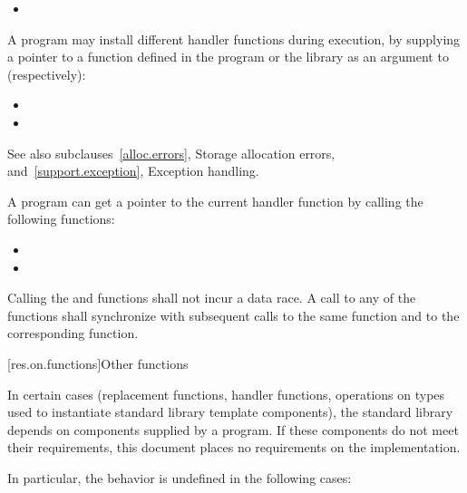 \begin{itemize}
\item
{}
%
\end{itemize}

\pnum
A \Cpp{} program may install different handler functions during execution, by
supplying a pointer to a function defined in the program or the library
as an argument to (respectively):
\begin{itemize}
\item {}
\item {}
\end{itemize}
See also subclauses~\ref{alloc.errors}, Storage allocation errors, and~\ref{support.exception},
Exception handling.

\pnum
A \Cpp{} program can get a pointer to the current handler function by calling the following
functions:

\begin{itemize}
\item
{}%
\item
{}
\end{itemize}

\pnum
Calling the  and  functions shall not incur a data race. A call to
any of the  functions shall synchronize with subsequent calls to the same
 function and to the corresponding  function.

[res.on.functions]{Other functions}

\pnum
In certain cases (replacement functions, handler functions, operations on types used to
instantiate standard library template components), the \Cpp{} standard library depends on
components supplied by a \Cpp{} program.
If these components do not meet their requirements, this document places no requirements
on the implementation.

\pnum
In particular, the behavior is undefined in the following cases:

